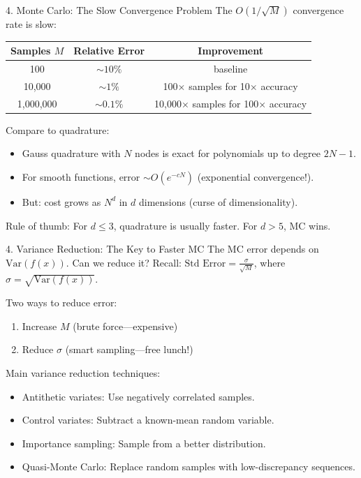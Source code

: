 \documentclass[aspectratio=169]{beamer}
\newcommand{\1}{\mathbf{1}}
\begin{document}
\begin{frame}{4. Monte Carlo: The Slow Convergence Problem}
\small
The $O(1/\sqrt{M})$ convergence rate is slow:
\begin{center}
\begin{tabular}{ccc}
\toprule
Samples $M$ & Relative Error & Improvement \\
\midrule
100 & $\sim 10\%$ & baseline \\
10,000 & $\sim 1\%$ & 100$\times$ samples for 10$\times$ accuracy \\
1,000,000 & $\sim 0.1\%$ & 10,000$\times$ samples for 100$\times$ accuracy \\
\bottomrule
\end{tabular}
\end{center}

Compare to quadrature:
\begin{itemize}\setlength{\itemsep}{1mm}
    \item Gauss quadrature with $N$ nodes is exact for polynomials up to degree $2N-1$.
    \item For smooth functions, error $\sim O(e^{-cN})$ (exponential convergence!).
    \item But: cost grows as $N^d$ in $d$ dimensions (curse of dimensionality).
\end{itemize}
Rule of thumb: For $d \leq 3$, quadrature is usually faster. For $d > 5$, MC wins.
\end{frame}

\begin{frame}{4. Variance Reduction: The Key to Faster MC}
\small
The MC error depends on $\text{Var}(f(x))$. Can we reduce it?
Recall: $\text{Std Error} = \frac{\sigma}{\sqrt{M}}$, where $\sigma = \sqrt{\text{Var}(f(x))}$.

Two ways to reduce error:
\begin{enumerate}\setlength{\itemsep}{1mm}
    \item Increase $M$ (brute force---expensive)
    \item Reduce $\sigma$ (smart sampling---free lunch!)
\end{enumerate}

Main variance reduction techniques:
\begin{itemize}\setlength{\itemsep}{1mm}
    \item Antithetic variates: Use negatively correlated samples.
    \item Control variates: Subtract a known-mean random variable.
    \item Importance sampling: Sample from a better distribution.
    \item Quasi-Monte Carlo: Replace random samples with low-discrepancy sequences.
\end{itemize}
\end{frame}
\end{document}
